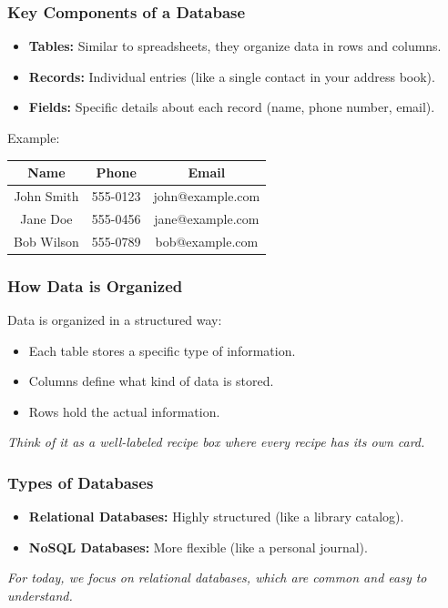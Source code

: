 \documentclass[10pt]{beamer}
\begin{document}
\begin{frame}[fragile]
  \frametitle{Key Components of a Database}
  \begin{itemize}
    \item \textbf{Tables:} Similar to spreadsheets, they organize data in rows and columns.
    \item \textbf{Records:} Individual entries (like a single contact in your address book).
    \item \textbf{Fields:} Specific details about each record (name, phone number, email).
  \end{itemize}

  \vspace{1em}

  Example:

  \begin{center}
    \begin{tabular}{ccc}
      \hline
      \textbf{Name} & \textbf{Phone} & \textbf{Email} \\
      \hline
      John Smith & 555-0123 & john@example.com \\
      Jane Doe & 555-0456 & jane@example.com \\
      Bob Wilson & 555-0789 & bob@example.com \\
      \hline
    \end{tabular}
  \end{center}
\end{frame}

\begin{frame}[fragile]
  \frametitle{How Data is Organized}
  Data is organized in a structured way:
  \begin{itemize}
    \item Each table stores a specific type of information.
    \item Columns define what kind of data is stored.
    \item Rows hold the actual information.
  \end{itemize}
  \textit{Think of it as a well-labeled recipe box where every recipe has its own card.}
\end{frame}

\begin{frame}[fragile]
  \frametitle{Types of Databases}
  \begin{itemize}
    \item \textbf{Relational Databases:} Highly structured (like a library catalog).
    \item \textbf{NoSQL Databases:} More flexible (like a personal journal).
  \end{itemize}
  \textit{For today, we focus on relational databases, which are common and easy to understand.}
\end{frame}
\end{document}
